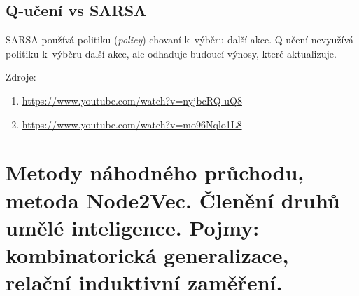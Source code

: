 \subsection{Q-učení vs SARSA}

SARSA používá politiku (\emph{policy}) chovaní k~výběru další akce.
Q-učení nevyužívá politiku k~výběru další akce, ale odhaduje budoucí výnosy, které aktualizuje.

Zdroje:
\begin{enumerate}
    \item \url{https://www.youtube.com/watch?v=nyjbcRQ-uQ8}
    \item \url{https://www.youtube.com/watch?v=mo96Nqlo1L8}
\end{enumerate}

\clearpage
\section{Metody náhodného průchodu, metoda Node2Vec. Členění druhů umělé inteligence. Pojmy: kombinatorická generalizace, relační induktivní zaměření.}

